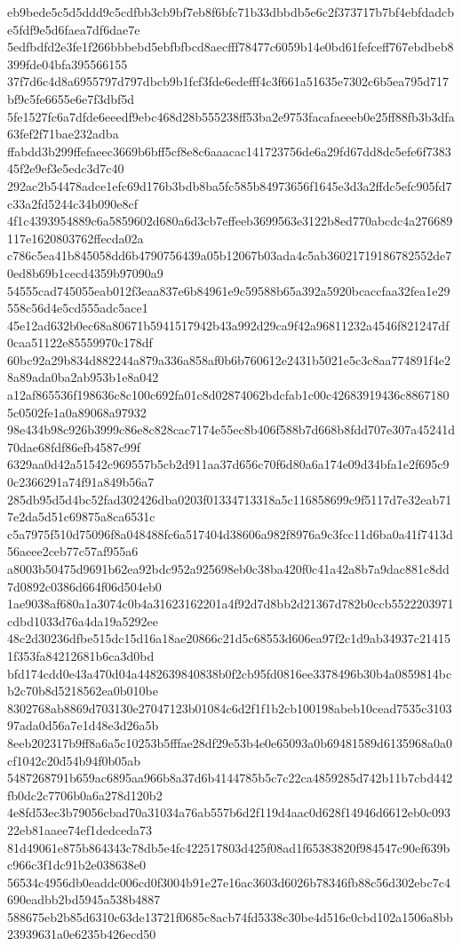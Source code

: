 {eb9bede5c5d5ddd9c5cdfbb3cb9bf7eb8f6bfc71b33dbbdb5e6c2f373717b7bf4ebfdadcbe5fdf9e5d6faea7df6dae7e
5edfbdfd2e3fe1f266bbbebd5ebfbfbcd8aecfff78477c6059b14e0bd61fefceff767ebdbeb8399fde04bfa395566155
37f7d6c4d8a6955797d797dbcb9b1fcf3fde6edefff4c3f661a51635e7302c6b5ea795d717bf9c5fe6655e6e7f3dbf5d
5fe1527fc6a7dfde6eeedf9ebc468d28b555238ff53ba2e9753facafaeeeb0e25ff88fb3b3dfa63fef2f71bae232adba
ffabdd3b299ffefaeec3669b6bff5cf8e8c6aaacac141723756de6a29fd67dd8dc5efe6f738345f2e9ef3e5edc3d7c40
292ac2b54478adce1efc69d176b3bdb8ba5fc585b84973656f1645e3d3a2ffdc5efc905fd7c33a2fd5244c34b090e8cf
4f1c4393954889c6a5859602d680a6d3cb7effeeb3699563e3122b8ed770abcdc4a276689117e1620803762ffecda02a
c786c5ea41b845058dd6b4790756439a05b12067b03ada4c5ab36021719186782552de70ed8b69b1cecd4359b97090a9
54555cad745055eab012f3eaa837e6b84961e9c59588b65a392a5920bcaccfaa32fea1e29558c56d4e5cd555adc5ace1
45e12ad632b0ec68a80671b5941517942b43a992d29ca9f42a96811232a4546f821247df0caa51122e85559970c178df
60bc92a29b834d882244a879a336a858af0b6b760612e2431b5021e5c3c8aa774891f4e28a89ada0ba2ab953b1e8a042
a12af865536f198636c8c100c692fa01c8d02874062bdcfab1c00c42683919436c88671805c0502fe1a0a89068a97932
98e434b98c926b3999c86e8c828cac7174e55ec8b406f588b7d668b8fdd707e307a45241d70dae68fdf86efb4587c99f
6329aa0d42a51542c969557b5cb2d911aa37d656c70f6d80a6a174e09d34bfa1e2f695c90c2366291a74f91a849b56a7
285db95d5d4bc52fad302426dba0203f01334713318a5c116858699c9f5117d7e32eab717e2da5d51c69875a8ca6531c
c5a7975f510d75096f8a048488fc6a517404d38606a982f8976a9c3fcc11d6ba0a41f7413d56aeee2ceb77c57af955a6
a8003b50475d9691b62ea92bdc952a925698eb0c38ba420f0c41a42a8b7a9dac881c8dd7d0892c0386d664f06d504eb0
1ae9038af680a1a3074c0b4a31623162201a4f92d7d8bb2d21367d782b0ccb5522203971cdbd1033d76a4da19a5292ee
48c2d30236dfbe515dc15d16a18ae20866c21d5c68553d606ea97f2c1d9ab34937c214151f353fa84212681b6ca3d0bd
bfd174cdd0e43a470d04a4482639840838b0f2cb95fd0816ee3378496b30b4a0859814bcb2c70b8d5218562ea0b010be
8302768ab8869d703130e27047123b01084c6d2f1f1b2cb100198abeb10cead7535c310397ada0d56a7e1d48e3d26a5b
8eeb202317b9ff8a6a5c10253b5fffae28df29e53b4e0e65093a0b69481589d6135968a0a0cf1042c20d54b94f0b05ab
5487268791b659ac6895aa966b8a37d6b4144785b5c7c22ca4859285d742b11b7cbd442fb0dc2c7706b0a6a278d120b2
4e8fd53ec3b79056cbad70a31034a76ab557b6d2f119d4aac0d628f14946d6612eb0c09322eb81aaee74ef1dedceda73
81d49061e875b864343c78db5e4fc422517803d425f08ad1f65383820f984547c90ef639bc966c3f1dc91b2e038638e0
56534c4956db0eaddc006cd0f3004b91e27e16ac3603d6026b78346fb88c56d302ebc7c4690eadbb2bd5945a538b4887
588675eb2b85d6310c63de13721f0685c8acb74fd5338c30be4d516c0cbd102a1506a8bb23939631a0e6235b426ecd50
}
